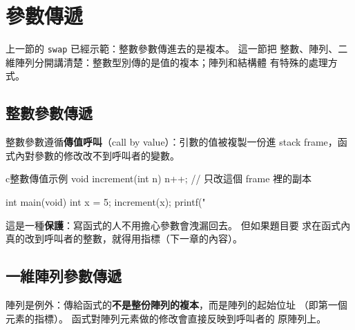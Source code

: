 \section{參數傳遞}
\label{sec:func-passing}

上一節的 \texttt{swap} 已經示範：整數參數傳進去的是複本。 這一節把
整數、陣列、二維陣列分開講清楚：整數型別傳的是值的複本；陣列和結構體
有特殊的處理方式。

\subsection{整數參數傳遞}

整數參數遵循\textbf{傳值呼叫}（call by value）：引數的值被複製一份進
stack frame，函式內對參數的修改改不到呼叫者的變數。

\begin{code}{c}{整數傳值示例}
void increment(int n) {
    n++;  // 只改這個 frame 裡的副本
}

int main(void) {
    int x = 5;
    increment(x);
    printf("%
}
\end{code}

這是一種\textbf{保護}：寫函式的人不用擔心參數會洩漏回去。 但如果題目要
求在函式內真的改到呼叫者的整數，就得用指標（下一章的內容）。

\subsection{一維陣列參數傳遞}

陣列是例外：傳給函式的\textbf{不是整份陣列的複本}，而是陣列的起始位址
（即第一個元素的指標）。 函式對陣列元素做的修改會直接反映到呼叫者的
原陣列上。


